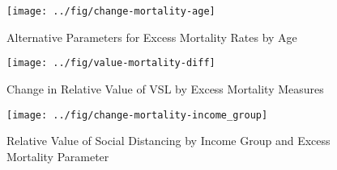 \documentclass[11pt]{article}
\begin{document}
\begin{figure}[htbp!]
\centering
\caption{Alternative Parameters for Excess Mortality Rates by Age}
\texttt{[image: ../fig/change-mortality-age]}
\label{fig:change-mortality-age}
\end{figure}


\begin{figure}[htbp!]
\centering
\caption{Change in Relative Value of VSL by Excess Mortality Measures}
\texttt{[image: ../fig/value-mortality-diff]}
\label{fig:value-mortality-diff}
\end{figure}

\begin{figure}[htbp!]
\centering
\caption{Relative Value of Social Distancing by Income Group and Excess Mortality Parameter}
\texttt{[image: ../fig/change-mortality-income\_group]}
\label{fig:change-mortality-income_group}
\end{figure}



\clearpage
\begin{singlespacing}

\printbibliography

\end{singlespacing}
\end{document}
